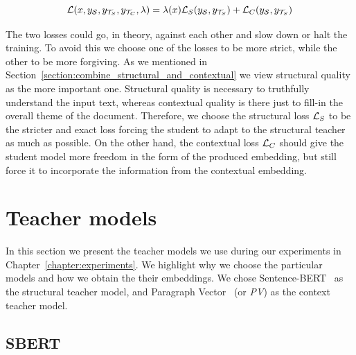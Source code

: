 \begin{equation}\label{eq:abstract_loss}
  \mathcal{L}(
    x,
    y_{\mathcal{S}},
    y_{\mathcal{T}_S},
    y_{\mathcal{T}_C},
    \lambda
  ) =
    \lambda(x) \mathcal{L}_S(y_{\mathcal{S}}, y_{\mathcal{T}_S}) +
            \mathcal{L}_C(y_{\mathcal{S}}, y_{\mathcal{T}_S})
\end{equation}


The two losses could go, in theory, against each other and slow down or halt
the training. To avoid this we choose one of the losses to be more strict,
while the other to be more forgiving. As we mentioned in
Section~\ref{section:combine_structural_and_contextual} we view structural
quality as the more important one. Structural quality is necessary to
truthfully understand the input text, whereas contextual quality is there just
to fill-in the overall theme of the document. Therefore, we choose the
structural loss $\mathcal{L}_S$ to be the stricter and exact loss forcing the student
to adapt to the structural teacher as much as possible. On the other hand, the
contextual loss $\mathcal{L}_C$ should give the student model more freedom in the
form of the produced embedding, but still force it to incorporate the
information from the contextual embedding.

\section{Teacher models}\label{section:teacher_models}


In this section we present the teacher models we use during our experiments in
Chapter~\ref{chapter:experiments}. We highlight why we choose the particular
models and how we obtain the their embeddings. We chose
Sentence-BERT~\citep{reimers2020making} as the structural teacher model, and
Paragraph Vector~\citep{le2014distributed} (or \emph{PV}) as the context teacher
model.

\subsection{SBERT}

